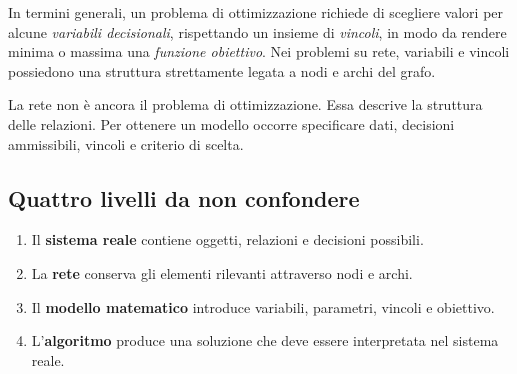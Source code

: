 \documentclass[11pt,a4paper]{article}
\begin{document}
In termini generali, un problema di ottimizzazione richiede di scegliere valori per alcune \emph{variabili decisionali}, rispettando un insieme di \emph{vincoli}, in modo da rendere minima o massima una \emph{funzione obiettivo}. Nei problemi su rete, variabili e vincoli possiedono una struttura strettamente legata a nodi e archi del grafo.

\begin{keybox}
La rete non è ancora il problema di ottimizzazione. Essa descrive la struttura delle relazioni. Per ottenere un modello occorre specificare dati, decisioni ammissibili, vincoli e criterio di scelta.
\end{keybox}

\subsection{Quattro livelli da non confondere}

\begin{center}
\end{center}

\begin{enumerate}
\item Il \textbf{sistema reale} contiene oggetti, relazioni e decisioni possibili.
\item La \textbf{rete} conserva gli elementi rilevanti attraverso nodi e archi.
\item Il \textbf{modello matematico} introduce variabili, parametri, vincoli e obiettivo.
\item L'\textbf{algoritmo} produce una soluzione che deve essere interpretata nel sistema reale.
\end{enumerate}
\end{document}
